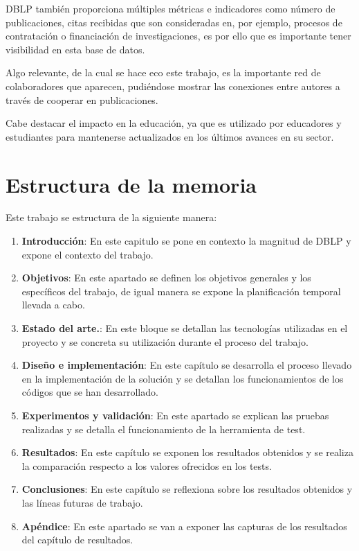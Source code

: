 \documentclass[a4paper, 12pt]{book}
\begin{document}
DBLP también proporciona múltiples métricas e indicadores como número de publicaciones, citas recibidas que son consideradas en, por ejemplo, procesos de contratación o financiación de investigaciones, es por ello que es importante tener visibilidad en esta base de datos.

Algo relevante, de la cual se hace eco este trabajo, es la importante red de colaboradores que aparecen, pudiéndose mostrar las conexiones entre autores a través de cooperar en publicaciones.

Cabe destacar el impacto en la educación, ya que es utilizado por educadores y estudiantes para mantenerse actualizados en los últimos avances en su sector.


\section{Estructura de la memoria}
\label{sec:estructura}

Este trabajo se estructura de la siguiente manera:
\begin{enumerate}
    \item \textbf{Introducción}: En este capitulo se pone en contexto la magnitud de DBLP y expone el contexto del trabajo.
    \item\textbf{Objetivos}: En este apartado se definen los objetivos generales y los específicos del trabajo, de igual manera se expone la planificación temporal llevada a cabo.
    \item\textbf{Estado del arte.}: En este bloque se detallan las tecnologías utilizadas en el proyecto y se concreta su utilización durante el proceso del trabajo.
    \item\textbf{Diseño e implementación}: En este capítulo se desarrolla el proceso llevado en la implementación de la solución y se detallan los funcionamientos de los códigos que se han desarrollado.
    \item\textbf{Experimentos y validación}: En este apartado se explican las pruebas realizadas y se detalla el funcionamiento de la herramienta de test.
    \item\textbf{Resultados}: En este capítulo se exponen los resultados obtenidos y se realiza la comparación respecto a los valores ofrecidos en los tests.
    \item\textbf{Conclusiones}: En este capítulo se reflexiona sobre los resultados obtenidos y las líneas futuras de trabajo.
    \item\textbf{Apéndice}: En este apartado se van a exponer las capturas de los resultados del capítulo de resultados.
\end{enumerate}
\end{document}
